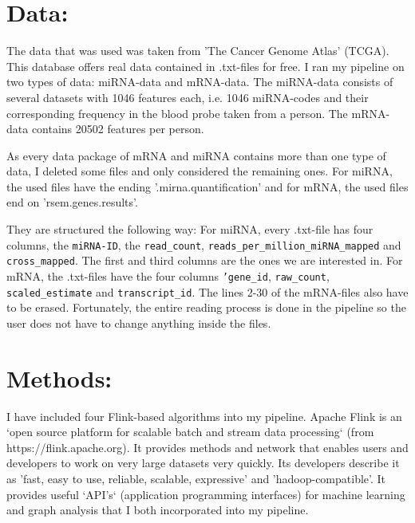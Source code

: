 \documentclass{bioinfo}
\begin{document}
 

\section{Data:}
 

The data that was used was taken from 'The Cancer Genome Atlas' (TCGA). This database offers real data contained in .txt-files for free. I ran my pipeline on two types of data: miRNA-data and mRNA-data. The miRNA-data consists of several datasets with 1046 features each, i.e. 1046 miRNA-codes and their corresponding frequency in the blood probe taken from a person. The mRNA-data contains 20502 features per person. 

As every data package of mRNA and miRNA contains more than one type of data, I deleted some files and only considered the remaining ones. For miRNA, the used files have the ending '.mirna.quantification' and for mRNA, the used files end on 'rsem.genes.results'. 

They are structured the following way: For miRNA, every .txt-file has four columns, the \texttt{miRNA-ID}, the \texttt{read\_count}, \texttt{reads\_per\_million\_miRNA\_mapped}
 and \texttt{cross\_mapped}. The first and third columns 
are the ones we are interested in. For mRNA, the 
.txt-files have the four columns \texttt{'gene\_id}, 
\texttt{raw\_count}, \texttt{scaled\_estimate} and 
\texttt{transcript\_id}. The lines 2-30 of the mRNA-files 
also have to be erased. Fortunately, the entire reading process is done in the pipeline so the user does not have to change anything inside the files. 

 

 

 

\section{Methods:}
 

I have included four Flink-based algorithms into my pipeline. Apache Flink is an `open source platform for scalable batch and stream data processing` (from https://flink.apache.org). It provides methods and network that enables users and developers to work on very large datasets very quickly. Its developers describe it as 'fast, easy to use, reliable, scalable, expressive' and 'hadoop-compatible'. It provides useful `API's` (application programming interfaces) for machine learning and graph analysis that I both incorporated into my pipeline. 
\end{document}
